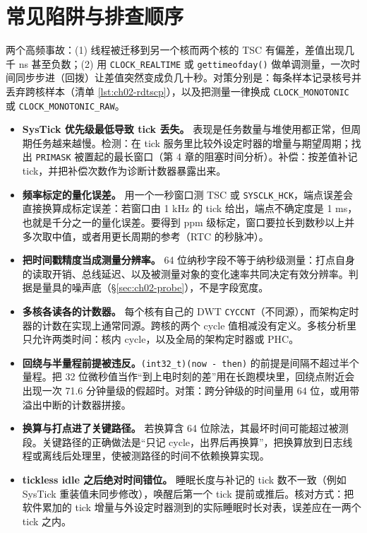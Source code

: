 \documentclass[12pt,a4paper,fontset=fandol]{ctexbook}
\newcommand{\Fn}[1]{\texttt{#1()}}
\newcommand{\Tp}[1]{\texttt{#1}}
\begin{document}
\section{常见陷阱与排查顺序}

\label{sec:ch02-traps}

\begin{warning}[title={裸 \Fn{\_rdtsc} 与墙上时间做单调测量}]
两个高频事故：(1) 线程被迁移到另一个核而两个核的 TSC 有偏差，差值出现几千 ns 甚至负数；(2) 用 \Tp{CLOCK\_REALTIME} 或 \Fn{gettimeofday} 做单调测量，一次时间同步步进（回拨）让差值突然变成负几十秒。对策分别是：每条样本记录核号并丢弃跨核样本（清单 \ref{lst:ch02-rdtscp}），以及把测量一律换成 \Tp{CLOCK\_MONOTONIC} 或 \Tp{CLOCK\_MONOTONIC\_RAW}。
\end{warning}

\begin{itemize}
  \item \textbf{SysTick 优先级最低导致 tick 丢失。} 表现是任务数量与堆使用都正常，但周期任务越来越慢。检测：在 tick 服务里比较外设定时器的增量与期望周期；找出 \Tp{PRIMASK} 被置起的最长窗口（第 4 章的阻塞时间分析）。补偿：按差值补记 tick，并把补偿次数作为诊断计数器暴露出来。
  \item \textbf{频率标定的量化误差。} 用一个一秒窗口测 TSC 或 \Tp{SYSCLK\_HCK}，端点误差会直接换算成标定误差：若窗口由 1 kHz 的 tick 给出，端点不确定度是 1 ms，也就是千分之一的量化误差。要得到 ppm 级标定，窗口要拉长到数秒以上并多次取中值，或者用更长周期的参考（RTC 的秒脉冲）。
  \item \textbf{把时间戳精度当成测量分辨率。} 64 位纳秒字段不等于纳秒级测量：打点自身的读取开销、总线延迟、以及被测量对象的变化速率共同决定有效分辨率。判据是量具的噪声底（\S\ref{sec:ch02-probe}），不是字段宽度。
  \item \textbf{多核各读各的计数器。} 每个核有自己的 DWT \Tp{CYCCNT}（不同源），而架构定时器的计数在实现上通常同源。跨核的两个 cycle 值相减没有定义。多核分析里只允许两类时间：核内 cycle，以及全局的架构定时器或 PHC。
  \item \textbf{回绕与半量程前提被违反。}\Tp{(int32\_t)(now - then)} 的前提是间隔不超过半个量程。把 32 位微秒值当作``到上电时刻的差''用在长跑模块里，回绕点附近会出现一次 71.6 分钟量级的假超时。对策：跨分钟级的时间量用 64 位，或用带溢出中断的计数器拼接。
  \item \textbf{换算与打点进了关键路径。} 若换算含 64 位除法，其最坏时间可能超过被测段。关键路径的正确做法是``只记 cycle，出界后再换算''，把换算放到日志线程或离线后处理里，使被测路径的时间不依赖换算实现。
  \item \textbf{tickless idle 之后绝对时间错位。} 睡眠长度与补记的 tick 数不一致（例如 SysTick 重装值未同步修改），唤醒后第一个 tick 提前或推后。核对方式：把软件累加的 tick 增量与外设定时器测到的实际睡眠时长对表，误差应在一两个 tick 之内。
\end{itemize}
\end{document}
